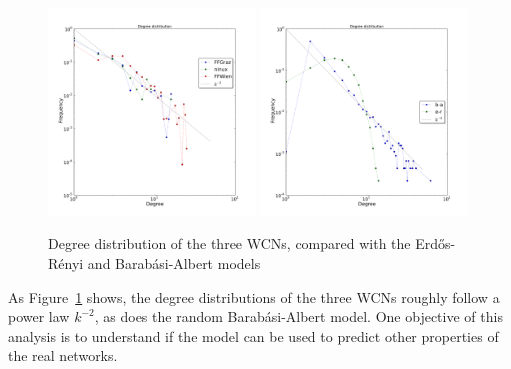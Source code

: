 \documentclass[a4paper,11pt,twoside,openright]{memoir}
\newcommand{\figref}[1] {Figure~\ref{#1}}
\begin{document}
\begin{figure}[hbt]
  \centering
  \hspace*{\fill}
  \includegraphics[width=0.49\textwidth]{graphs/degree_distribution_wcn.pdf}
  \hfill
  \includegraphics[width=0.49\textwidth]{graphs/degree_distribution_syn.pdf}
  \hspace*{\fill}
  \caption{Degree distribution of the three WCNs, compared with the
    Erd\H{o}s-Rényi and Barabási-Albert models}
  \label{fig:wcn-degree-distribution}
\end{figure}

As \figref{fig:wcn-degree-distribution}
shows, the degree distributions of the three WCNs
roughly follow a power law $k^{-2}$, as does the random Barabási-Albert
model. One objective of this analysis is to understand if the model can
be used to predict other properties of the real networks.
\end{document}
